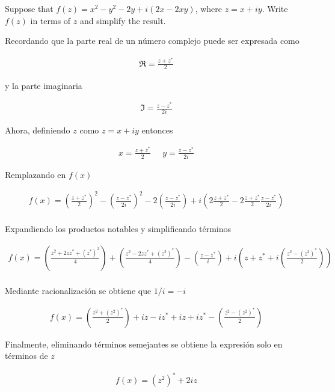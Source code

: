 \begin{problem}{3}
    Suppose that $f(z) = x^2 -y^2 -2y +i(2x-2xy)$, where $z = x+iy$. Write $f(z)$ in terms of $z$ and simplify the result.
\end{problem}


Recordando que la parte real de un número complejo puede ser expresada como 

\begin{gather*}
    \Re = \frac{z + z^{*}}{2}
\end{gather*}

y la parte imaginaria 

\begin{gather*}
    \Im = \frac{z - z^{*}}{2i}
\end{gather*}

Ahora, definiendo $z$ como $z = x + iy$ entonces 

\begin{gather*}
    x = \frac{z + z^{*}}{2} \;\;\;\;\; y = \frac{z - z^{*}}{2i}
\end{gather*}

Remplazando en $f(x)$ 


\begin{gather*}
    f(x) = \left(\frac{z + z^{*}}{2}\right)^{2} - \left( \frac{z - z^{*}}{2i}\right)^2 - 2( \frac{z - z^{*}}{2i}) + i\left(2\frac{z + z^{*}}{2} - 2 \frac{z + z^{*}}{2}\frac{z - z^{*}}{2i}\right)\\
\end{gather*}

Expandiendo los productos notables y simplificando términos 

\begin{gather*}
    f(x) = \left(\frac{z^2 +2zz^{*}+ (z^{*})^2}{4}\right) + \left( \frac{z^2 -2zz^{*} + (z^2)^{*}}{4}\right) - \left( \frac{z - z^{*}}{i}\right) + i\left(z + z^{*} +  i\left(\frac{z^2 - (z^2)^{*}}{2}\right)\right)\\
\end{gather*}

Mediante racionalización se obtiene que $1/i = -i$

\begin{gather*}
    f(x) = \left( \frac{z^2  + (z^2)^{*}}{2}\right) + iz - iz^{*} + iz + iz^{*} -  \left(\frac{z^2 - (z^2)^{*}}{2}\right)
\end{gather*}

Finalmente, eliminando términos semejantes se obtiene la expresión solo en términos de $z$

\begin{mdframed}
    \vspace{-0.25cm}
    \begin{gather}
    f(x) =  (z^{2})^{*} + 2iz
    \end{gather}
    \vspace{-0.3cm}
\end{mdframed}

